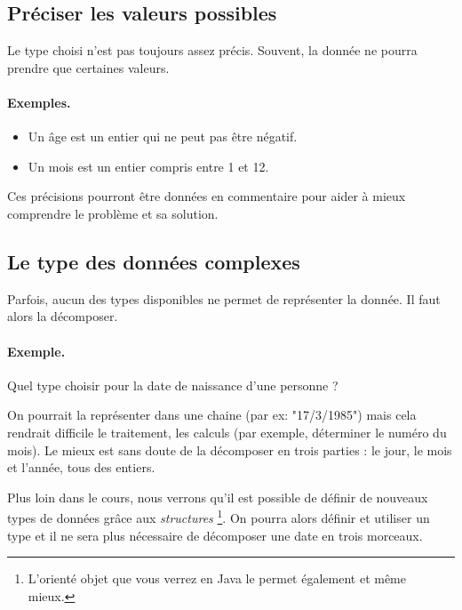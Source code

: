 		\subsection{Préciser les valeurs possibles}
		
			Le type choisi n'est pas toujours assez précis.
			Souvent, la donnée ne pourra prendre que certaines valeurs.
			
			\begin{Emphase}
				\paragraph{Exemples.}	
				\begin{itemize} 
				\item Un âge est un entier qui ne peut pas être négatif.
				\item Un mois est un entier compris entre 1 et 12.
				\end{itemize}
			\end{Emphase}
			
			Ces précisions pourront être données en commentaire
			pour aider à mieux comprendre le problème et sa solution.
	
		\subsection{Le type des données complexes}
		
			Parfois, aucun des types disponibles ne permet de représenter 
			la donnée.
			Il faut alors la décomposer.
			
			\begin{Emphase}
				\paragraph{Exemple.}	
				Quel type choisir 
				pour la date de naissance d'une personne ?
				
				On pourrait la représenter dans une chaine 
				(par ex: "17/3/1985")
				mais cela rendrait difficile le traitement, les calculs
				(par exemple, déterminer le numéro du mois).
				Le mieux est sans doute de la décomposer en trois parties : 
				le jour, le mois et l'année, tous des entiers.
			\end{Emphase}
			
			Plus loin dans le cours,
			nous verrons qu'il est possible de définir de nouveaux
			types de données grâce aux \emph{structures}%
			\footnote{
				L'orienté objet que vous verrez en Java
				le permet également et même mieux.%
			}. 
			On pourra alors définir et utiliser un type 
			et il ne sera plus nécessaire de décomposer une date en trois
			morceaux.
	
